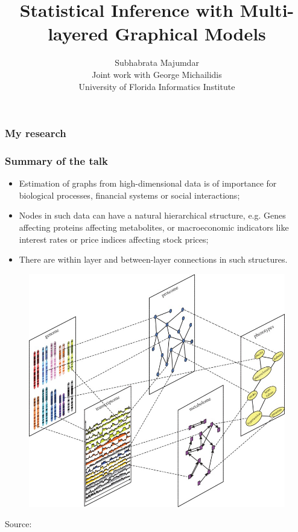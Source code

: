 \documentclass[10pt]{beamer}
\title[ Multi-layered Graphical Models]
{\Large  
Statistical Inference with Multi-layered Graphical Models}
\author[Majumdar and Michailidis]{Subhabrata Majumdar\\
{\footnotesize Joint work with George Michailidis\\
University of Florida Informatics Institute}}
\institute[]{AT\&T Labs - Research, Bedminster, NJ\\
April 5, 2018}
\date{}
\date[April 5, 2018]
\theoremstyle{definition}
\begin{document}

\frame{ \titlepage}

\begin{frame}
\frametitle{My research}

\end{frame}


\begin{frame}
\frametitle{Summary of the talk}
\begin{itemize}
\item Estimation of graphs from high-dimensional data is of importance for biological processes, financial systems or social interactions;

\vspace{1em}
\item Nodes in such data can have a natural hierarchical structure, e.g. Genes affecting proteins affecting metabolites, or macroeconomic indicators like interest rates or price indices affecting stock prices;

\vspace{1em}
\item There are within layer and between-layer connections in such structures.
\end{itemize}
\end{frame}

\begin{frame}

\begin{figure}
\centering
\includegraphics[height=.9\textheight]{data_integration_schematic}
\end{figure}

{\center
{\scriptsize Source: {\colr \cite{GligPrzulj15}}}
}
\end{frame}
\end{document}
